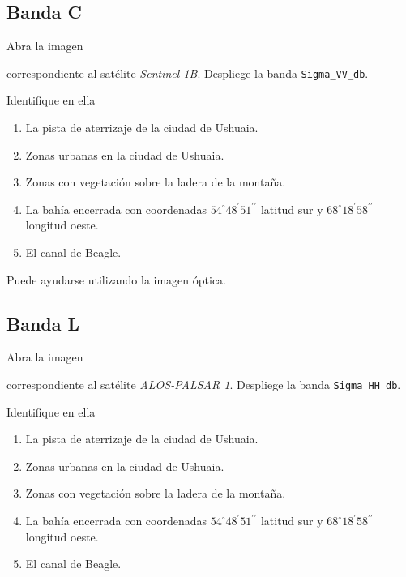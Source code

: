 \subsection{Banda C}

Abra la imagen
\begin{center}
  \end{center}

correspondiente al satélite \emph{Sentinel 1B}. Despliege la banda \texttt{Sigma\_VV\_db}.

Identifique en ella

\begin{enumerate}
    \item La pista de aterrizaje de la ciudad de Ushuaia.
    \item Zonas urbanas en la ciudad de Ushuaia.
    \item Zonas con vegetación sobre la ladera de la montaña.
    \item La bahía encerrada con coordenadas $54^\circ 48^\prime 51^{\prime\prime}$ latitud sur y $68^\circ 18^\prime 58^{\prime\prime}$ longitud oeste.
    \item El canal de Beagle.
\end{enumerate}

Puede ayudarse utilizando la imagen óptica.

\subsection{Banda L}

Abra la imagen
\begin{center}
\end{center}
correspondiente al satélite \emph{ALOS-PALSAR 1}. Despliege la banda \texttt{Sigma\_HH\_db}.

Identifique en ella

\begin{enumerate}
    \item La pista de aterrizaje de la ciudad de Ushuaia.
    \item Zonas urbanas en la ciudad de Ushuaia.
    \item Zonas con vegetación sobre la ladera de la montaña.
    \item La bahía encerrada con coordenadas $54^\circ 48^\prime 51^{\prime\prime}$ latitud sur y $68^\circ 18^\prime 58^{\prime\prime}$ longitud oeste.
    \item El canal de Beagle.
\end{enumerate}

